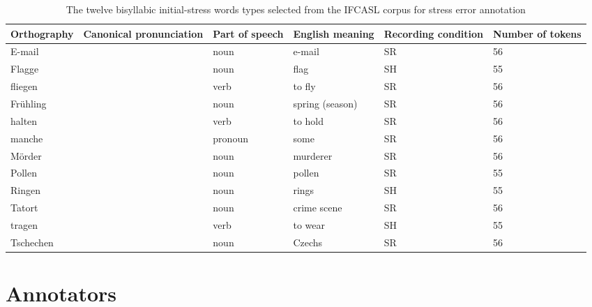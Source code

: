	\begin{table}[htb]
		\centering
		\caption{The twelve bisyllabic initial-stress words types selected from the IFCASL corpus for stress error annotation %
		}
		
		\begin{tabularx}{\textwidth}{lXXXXX}
		\toprule
		
		Orthography & 
		Canonical \linebreak pronunciation & 
		Part of speech & 
		English \linebreak meaning & 
		Recording condition & 
		Number \linebreak of tokens \\%
		
		\midrule
		E-mail	&	\TODO{prons} &	noun &	e-mail &	SR 	&	56	\\
		Flagge	&	&	noun &	 flag &	SH	&	55	\\
		fliegen	&	&	verb &	to fly &	SR		& 56	\\
		Frühling	&	& noun	&	spring \newline (season) &	SR		&	56	\\
		halten	&	&	verb &	to hold &	SR 	&	56	\\
		manche	&	&	pronoun &	some & 	SR 	&	56	\\
		Mörder	&	&	noun &	murderer &	SR 	&	56	\\
		Pollen	&	&	noun &	pollen &	SR 	& 	55	\\
		Ringen	&	&	noun &	rings &	SH	&	55	\\
		Tatort	&	&	noun &	crime scene & 	SR 	&		56	\\
		tragen	&	&	verb &	to wear &	SH	&	55	\\
		Tschechen	&	& noun	&	Czechs	&	SR		& 56	\\
		\bottomrule
		\end{tabularx}
		\label{tab:bisyllwords}
	\end{table}
	
	\section{Annotators}
	\label{sec:lexstress:annotators}
	
